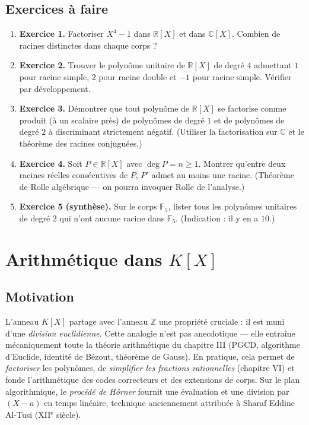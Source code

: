 \subsection{Exercices à faire}
\begin{enumerate}
    \item \textbf{Exercice 1.} Factoriser $X^4 - 1$ dans $\mathbb{R}[X]$ et dans $\mathbb{C}[X]$. Combien de racines distinctes dans chaque corps ?
    \item \textbf{Exercice 2.} Trouver le polynôme unitaire de $\mathbb{R}[X]$ de degré $4$ admettant $1$ pour racine simple, $2$ pour racine double et $-1$ pour racine simple. Vérifier par développement.
    \item \textbf{Exercice 3.} Démontrer que tout polynôme de $\mathbb{R}[X]$ se factorise comme produit (à un scalaire près) de polynômes de degré $1$ et de polynômes de degré $2$ à discriminant strictement négatif. (Utiliser la factorisation sur $\mathbb{C}$ et le théorème des racines conjuguées.)
    \item \textbf{Exercice 4.} Soit $P \in \mathbb{R}[X]$ avec $\deg P = n \ge 1$. Montrer qu'entre deux racines réelles consécutives de $P$, $P'$ admet au moins une racine. (Théorème de Rolle algébrique --- on pourra invoquer Rolle de l'analyse.)
    \item \textbf{Exercice 5 (synthèse).} Sur le corps $\mathbb{F}_5$, lister tous les polynômes unitaires de degré $2$ qui n'ont aucune racine dans $\mathbb{F}_5$. (Indication : il y en a $10$.)
\end{enumerate}

\section{Arithmétique dans $K[X]$}

\subsection{Motivation}
L'anneau $K[X]$ partage avec l'anneau $\mathbb{Z}$ une propriété cruciale : il est muni d'une \emph{division euclidienne}. Cette analogie n'est pas anecdotique --- elle entraîne mécaniquement toute la théorie arithmétique du chapitre III (PGCD, algorithme d'Euclide, identité de Bézout, théorème de Gauss). En pratique, cela permet de \emph{factoriser} les polynômes, de \emph{simplifier les fractions rationnelles} (chapitre VI) et fonde l'arithmétique des codes correcteurs et des extensions de corps. Sur le plan algorithmique, le \emph{procédé de Hörner} fournit une évaluation et une division par $(X - a)$ en temps linéaire, technique anciennement attribuée à Sharaf Eddine Al-Tusi (XII$^{\text{e}}$ siècle).

